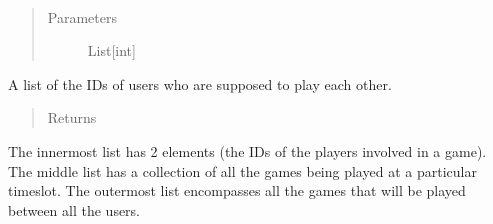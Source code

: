\documentclass[letterpaper,10pt,english]{sphinxmanual}
\begin{document}
\begin{fulllineitems}
\label{\detokenize{tiger_leagues/models/readme:tiger_leagues.models.admin_model.fixture_generator}}~\begin{quote}\begin{description}
\item[{Parameters}] \leavevmode
{} \textendash{} List{[}int{]}

\end{description}\end{quote}

A list of the IDs of users who are supposed to play each other.
\begin{quote}\begin{description}
\item[{Returns}] \leavevmode
{}

\end{description}\end{quote}

The innermost list has 2 elements (the IDs of the players involved in a game). 
The middle list has a collection of all the games being played at a 
particular timeslot. The outermost list encompasses all the games that will 
be played between all the users.

\end{fulllineitems}

\end{document}
